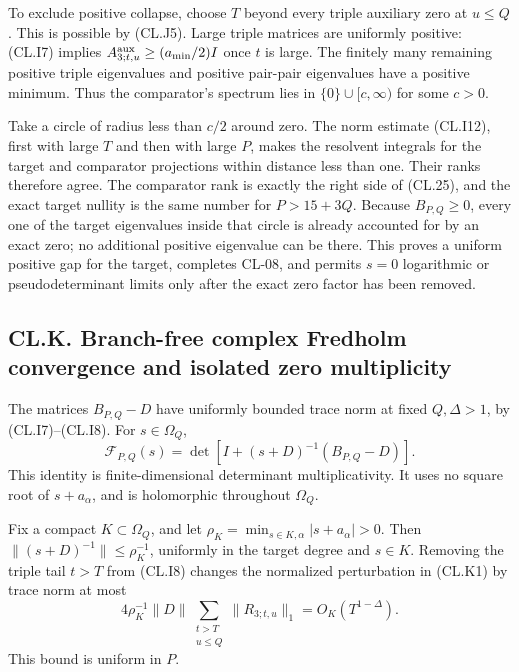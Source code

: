 \documentclass[a4paper,11pt]{article}
\numberwithin{equation}{section}
\begin{document}
To exclude positive collapse, choose \(T\) beyond every triple auxiliary zero at \(u\leq Q\). This is possible by (CL.J5). Large triple matrices are uniformly positive: (CL.I7) implies \(A_{3;t,u}^{\rm aux}\geq(a_{\min}/2)I\) once \(t\) is large. The finitely many remaining positive triple eigenvalues and positive pair-pair eigenvalues have a positive minimum. Thus the comparator's spectrum lies in \(\{0\}\cup[c,\infty)\) for some \(c>0\).

Take a circle of radius less than \(c/2\) around zero. The norm estimate (CL.I12), first with large \(T\) and then with large \(P\), makes the resolvent integrals for the target and comparator projections within distance less than one. Their ranks therefore agree. The comparator rank is exactly the right side of (CL.25), and the exact target nullity is the same number for \(P>15+3Q\). Because \(B_{P,Q}\geq0\), every one of the target eigenvalues inside that circle is already accounted for by an exact zero; no additional positive eigenvalue can be there. This proves a uniform positive gap for the target, completes CL-08, and permits \(s=0\) logarithmic or pseudodeterminant limits only after the exact zero factor has been removed.

\hypertarget{cl.k.-branch-free-complex-fredholm-convergence-and-isolated-zero-multiplicity}{%
\subsection{CL.K. Branch-free complex Fredholm convergence and isolated zero multiplicity}\label{cl.k.-branch-free-complex-fredholm-convergence-and-isolated-zero-multiplicity}}

The matrices \(B_{P,Q}-D\) have uniformly bounded trace norm at fixed \(Q,\Delta>1\), by (CL.I7)--(CL.I8). For \(s\in\Omega_Q\), \[
\mathcal F_{P,Q}(s)
=\det\!\left[I+(s+D)^{-1}(B_{P,Q}-D)\right].
\tag{CL.K1}
\] This identity is finite-dimensional determinant multiplicativity. It uses no square root of \(s+a_\alpha\), and is holomorphic throughout \(\Omega_Q\).

Fix a compact \(K\subset\Omega_Q\), and let \(\rho_K=\min_{s\in K,\alpha}|s+a_\alpha|>0\). Then \(\|(s+D)^{-1}\|\leq\rho_K^{-1}\), uniformly in the target degree and \(s\in K\). Removing the triple tail \(t>T\) from (CL.I8) changes the normalized perturbation in (CL.K1) by trace norm at most \[
4\rho_K^{-1}\|D\|
\sum_{\substack{t>T\\u\leq Q}}\|R_{3;t,u}\|_1
=O_K(T^{1-\Delta}).
\tag{CL.K2}
\] This bound is uniform in \(P\).
\end{document}
